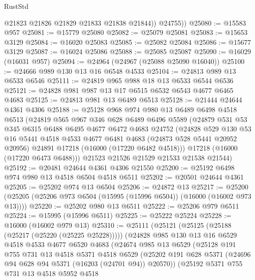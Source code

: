 \begin{lexlean}{RustStd}
\begin{coremodule}
            @21823
            @21826
            @21829
            @21833
            @21838
            @21844))
        @24755))
@25080 := @15583 @957
@25081 := @15779 @25080
@25082 := @25079 @25081
@25083 := @15653 @3129
@25084 := @16020 @25083
@25085 := @25082 @25084
@25086 := @15677 @3129
@25087 := @16024 @25086
@25088 := @25085 @25087
@25090 := @16029 (@16031 @957)
@25094 := @24964 (@24967 (@25088 @25090 @16040))
@25100 := @24666 @989 @130 @13 @16 @6548 @4533
@25104 := @24813 @989 @13 @6533 @6546
@25111 := @24819 @965 @988 @18 @13 @6533 @6544 @6536
@25121 := @24828 @981 @987 @13 @17 @6515 @6532 @6543 @4677 @6465 @4683
@25125 := @24813 @981 @13 @6489 @6513
@25128 := @21444 @24644 @4361 @4306
@25188 := @25128
    @968
    @974
    @980
    @13
    @6489
    @6498
    @4518
    @6513
    (@24819
      @565
      @967
      @346
      @628
      @6489
      @6496
      @5589
      (@24879
        @531
        @53
        @345
        @6315
        @6488
        @6495
        @4677
        @6472
        @4683
        @24752
        (@24828
          @529
          @130
          @53
          @16
          @5441
          @4518
          @4533
          @4677
          @6481
          @4683
          (@24873 @528 @5441 @20952 @20956)
          @24891
          @17218
          (@16000 (@17220 @6482 @4518)))
        @17218
        (@16000 (@17220 @6473 @6488)))
      @21523
      @21526
      @21529
      @21533
      @21538
      @21544)
@25192 := @20481 @24644 @4361 @4306 @21550
@25200 := @25192 @6498 @974 @980 @13 @4518 @6504 @4518 @6511
@25202 := @20501 @24644 @4361
@25205 := @25202 @974 @13 @6504
@25206 := @24872 @13
@25217 := @25200 (@25205 (@25206 @973 @6504 (@15995 (@15996 @6504)) (@16000 (@16002 @973 @13))))
@25220 := @25202 @980 @13 @6511
@25222 := @25206 @979 @6511
@25224 := @15995 (@15996 @6511)
@25225 := @25222 @25224
@25228 := @16000 (@16002 @979 @13)
@25310 := @25111
    (@25121
      (@25125 (@25188 (@25217 (@25220 (@25225 @25228)))))
      (@24828
        @985
        @130
        @13
        @16
        @6529
        @4518
        @4533
        @4677
        @6520
        @4683
        (@24674
          @985
          @13
          @6529
          (@25128
            @191
            @755
            @731
            @13
            @4518
            @5371
            @4518
            @6529
            (@25202 @191 @628 @5371 (@24696 @94 @628 @94 @5371 (@16203 (@24701 @94)) @20570))
            (@25192
              @5371
              @755
              @731
              @13
              @4518
              @5952
              @4518

\end{coremodule}
\end{lexlean}
